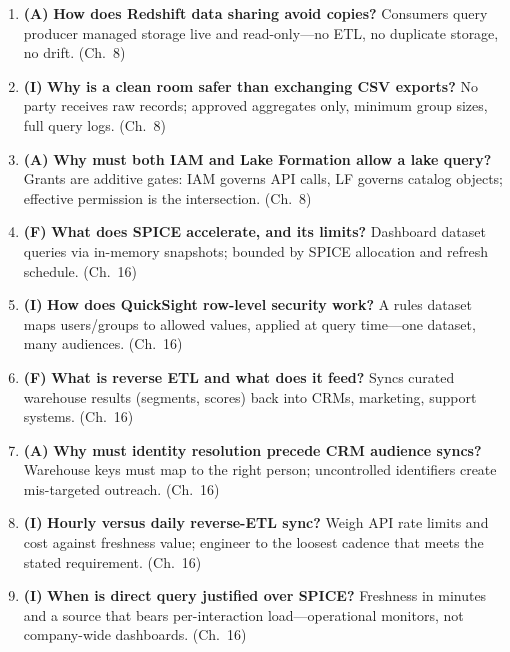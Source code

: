 \begin{enumerate}
    Sensitive attributes on shareable tables---segments visible, \texttt{pii\_email} absent, no
    view or copy. (Ch.~8)
    \item \textbf{(A)} \textbf{How does Redshift data sharing avoid copies?}
    Consumers query producer managed storage live and read-only---no ETL, no duplicate storage, no
    drift. (Ch.~8)
    \item \textbf{(I)} \textbf{Why is a clean room safer than exchanging CSV exports?}
    No party receives raw records; approved aggregates only, minimum group sizes, full query logs.
    (Ch.~8)
    \item \textbf{(A)} \textbf{Why must both IAM and Lake Formation allow a lake query?}
    Grants are additive gates: IAM governs API calls, LF governs catalog objects; effective
    permission is the intersection. (Ch.~8)
    \item \textbf{(F)} \textbf{What does SPICE accelerate, and its limits?}
    Dashboard dataset queries via in-memory snapshots; bounded by SPICE allocation and refresh
    schedule. (Ch.~16)
    \item \textbf{(I)} \textbf{How does QuickSight row-level security work?}
    A rules dataset maps users/groups to allowed values, applied at query time---one dataset, many
    audiences. (Ch.~16)
    \item \textbf{(F)} \textbf{What is reverse ETL and what does it feed?}
    Syncs curated warehouse results (segments, scores) back into CRMs, marketing, support systems.
    (Ch.~16)
    \item \textbf{(A)} \textbf{Why must identity resolution precede CRM audience syncs?}
    Warehouse keys must map to the right person; uncontrolled identifiers create mis-targeted
    outreach. (Ch.~16)
    \item \textbf{(I)} \textbf{Hourly versus daily reverse-ETL sync?}
    Weigh API rate limits and cost against freshness value; engineer to the loosest cadence that
    meets the stated requirement. (Ch.~16)
    \item \textbf{(I)} \textbf{When is direct query justified over SPICE?}
    Freshness in minutes and a source that bears per-interaction load---operational monitors, not
    company-wide dashboards. (Ch.~16)
\end{enumerate}

